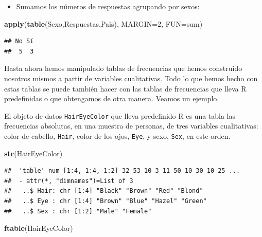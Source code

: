 \documentclass[]{book}
\newenvironment{Shaded}{\begin{snugshade}}{\end{snugshade}}
\newcommand{\DataTypeTok}[1]{\textcolor[rgb]{0.13,0.29,0.53}{#1}}
\newcommand{\DecValTok}[1]{\textcolor[rgb]{0.00,0.00,0.81}{#1}}
\newcommand{\KeywordTok}[1]{\textcolor[rgb]{0.13,0.29,0.53}{\textbf{#1}}}
\newcommand{\NormalTok}[1]{#1}
\providecommand{\tightlist}{%
  \setlength{\itemsep}{0pt}\setlength{\parskip}{0pt}}
\theoremstyle{definition}
\theoremstyle{definition}
\theoremstyle{definition}
\theoremstyle{remark}
\let\BeginKnitrBlock\begin \let\EndKnitrBlock\end
\begin{document}
\begin{itemize}
\tightlist
\item
  Sumamos los números de respuestas agrupando por sexos:
\end{itemize}

\begin{Shaded}
\begin{Highlighting}[]
\KeywordTok{apply}\NormalTok{(}\KeywordTok{table}\NormalTok{(Sexo,Respuestas,Pais), }\DataTypeTok{MARGIN=}\DecValTok{2}\NormalTok{, }\DataTypeTok{FUN=}\NormalTok{sum)}
\end{Highlighting}
\end{Shaded}

\begin{verbatim}
## No Sí 
##  5  3
\end{verbatim}

Hasta ahora hemos manipulado tablas de frecuencias que hemos construido nosotros mismos a partir de variables cualitativas. Todo lo que hemos hecho con estas tablas se puede también hacer con las tablas de frecuencias que lleva R predefinidas o que obtengamos de otra manera. Veamos un ejemplo.

\BeginKnitrBlock{example}
\protect\hypertarget{exm:HairEyeColor}{}{\label{exm:HairEyeColor} }El objeto de datos \texttt{HairEyeColor} que lleva predefinido R es una tabla las frecuencias absolutas, en una muestra de personas, de tres variables cualitativas: color de cabello, \texttt{Hair}, color de los ojos, \texttt{Eye}, y sexo, \texttt{Sex}, en este orden.
\EndKnitrBlock{example}

\begin{Shaded}
\begin{Highlighting}[]
\KeywordTok{str}\NormalTok{(HairEyeColor)}
\end{Highlighting}
\end{Shaded}

\begin{verbatim}
##  'table' num [1:4, 1:4, 1:2] 32 53 10 3 11 50 10 30 10 25 ...
##  - attr(*, "dimnames")=List of 3
##   ..$ Hair: chr [1:4] "Black" "Brown" "Red" "Blond"
##   ..$ Eye : chr [1:4] "Brown" "Blue" "Hazel" "Green"
##   ..$ Sex : chr [1:2] "Male" "Female"
\end{verbatim}

\begin{Shaded}
\begin{Highlighting}[]
\KeywordTok{ftable}\NormalTok{(HairEyeColor)}
\end{Highlighting}
\end{Shaded}
\end{document}
